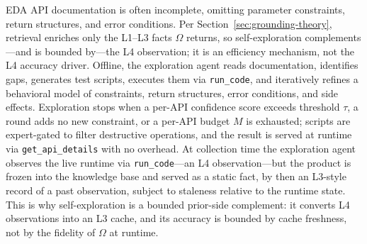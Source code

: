EDA API documentation is often incomplete, omitting parameter constraints, return structures, and error conditions. Per Section~\ref{sec:grounding-theory}, retrieval enriches only the L1--L3 facts $\Omega$ returns, so self-exploration complements---and is bounded by---the L4 observation; it is an efficiency mechanism, not the L4 accuracy driver. Offline, the exploration agent reads documentation, identifies gaps, generates test scripts, executes them via \texttt{run\_code}, and iteratively refines a behavioral model of constraints, return structures, error conditions, and side effects. Exploration stops when a per-API confidence score exceeds threshold $\tau$, a round adds no new constraint, or a per-API budget $M$ is exhausted; scripts are expert-gated to filter destructive operations, and the result is served at runtime via \texttt{get\_api\_details} with no overhead. At collection time the exploration agent observes the live runtime via \texttt{run\_code}---an L4 observation---but the product is frozen into the knowledge base and served as a static fact, by then an L3-style record of a past observation, subject to staleness relative to the runtime state. This is why self-exploration is a bounded prior-side complement: it converts L4 observations into an L3 cache, and its accuracy is bounded by cache freshness, not by the fidelity of $\Omega$ at runtime.
